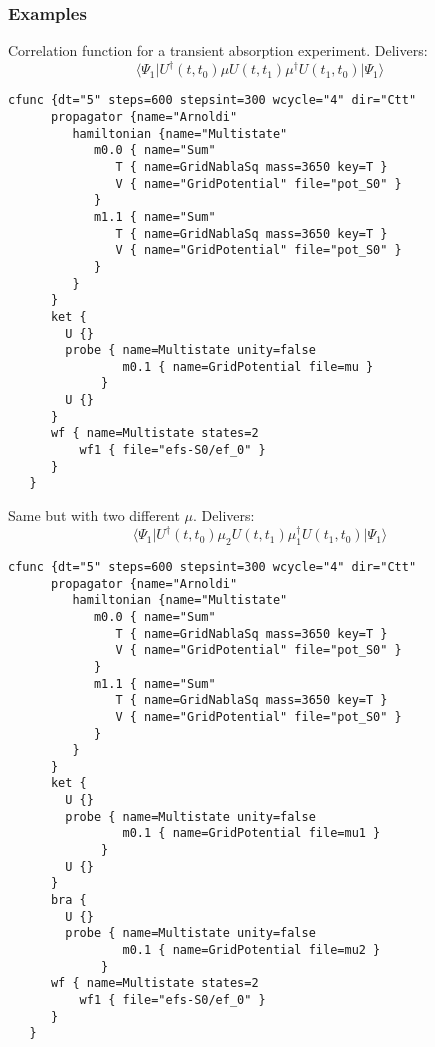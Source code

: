 \documentclass[a4paper,12pt]{scrbook}
\begin{document}
\subsubsection*{Examples}
Correlation function for a transient absorption experiment.
Delivers:
\begin{equation*}
\langle \Psi_1\rvert U^\dagger(t,t_0)\mu U(t,t_1)\mu^\dagger U(t_1,t_0)\lvert\Psi_1\rangle
\end{equation*}
\begin{verbatim}
cfunc {dt="5" steps=600 stepsint=300 wcycle="4" dir="Ctt"
      propagator {name="Arnoldi"
         hamiltonian {name="Multistate"
            m0.0 { name="Sum"
               T { name=GridNablaSq mass=3650 key=T }
               V { name="GridPotential" file="pot_S0" }
            }
            m1.1 { name="Sum"
               T { name=GridNablaSq mass=3650 key=T }
               V { name="GridPotential" file="pot_S0" }
            }
         }
      }
      ket {
        U {}
        probe { name=Multistate unity=false
                m0.1 { name=GridPotential file=mu }
             }
        U {}
      }
      wf { name=Multistate states=2
          wf1 { file="efs-S0/ef_0" }
      }
   }

\end{verbatim}

Same but with two different $\mu$.
Delivers:
\begin{equation*}
\langle \Psi_1\rvert U^\dagger(t,t_0)\mu_2 U(t,t_1)\mu_1^\dagger U(t_1,t_0)\lvert\Psi_1\rangle
\end{equation*}
\begin{verbatim}
cfunc {dt="5" steps=600 stepsint=300 wcycle="4" dir="Ctt"
      propagator {name="Arnoldi"
         hamiltonian {name="Multistate"
            m0.0 { name="Sum"
               T { name=GridNablaSq mass=3650 key=T }
               V { name="GridPotential" file="pot_S0" }
            }
            m1.1 { name="Sum"
               T { name=GridNablaSq mass=3650 key=T }
               V { name="GridPotential" file="pot_S0" }
            }
         }
      }
      ket {
        U {}
        probe { name=Multistate unity=false
                m0.1 { name=GridPotential file=mu1 }
             }
        U {}
      }
      bra {
        U {}
        probe { name=Multistate unity=false
                m0.1 { name=GridPotential file=mu2 }
             }      
      wf { name=Multistate states=2
          wf1 { file="efs-S0/ef_0" }
      }
   }

\end{verbatim}
\end{document}
